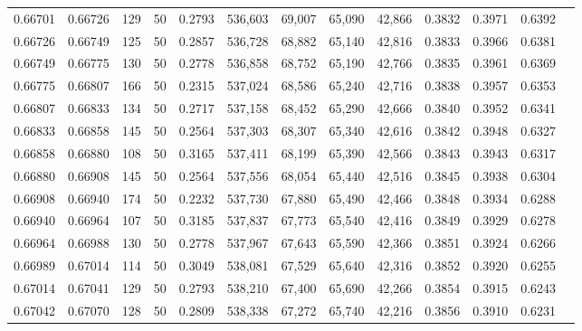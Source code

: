 \begin{tabular}{rrrrrrrrrrrrr}
0.66701 & 0.66726 &   129 &  50 &                                     0.2793 & 536,603 &  69,007 &  65,090 &  42,866 & 0.3832 & 0.3971 & 0.6392 \\
0.66726 & 0.66749 &   125 &  50 &                                     0.2857 & 536,728 &  68,882 &  65,140 &  42,816 & 0.3833 & 0.3966 & 0.6381 \\
0.66749 & 0.66775 &   130 &  50 &                                     0.2778 & 536,858 &  68,752 &  65,190 &  42,766 & 0.3835 & 0.3961 & 0.6369 \\
0.66775 & 0.66807 &   166 &  50 &                                     0.2315 & 537,024 &  68,586 &  65,240 &  42,716 & 0.3838 & 0.3957 & 0.6353 \\
0.66807 & 0.66833 &   134 &  50 &                                     0.2717 & 537,158 &  68,452 &  65,290 &  42,666 & 0.3840 & 0.3952 & 0.6341 \\
0.66833 & 0.66858 &   145 &  50 &                                     0.2564 & 537,303 &  68,307 &  65,340 &  42,616 & 0.3842 & 0.3948 & 0.6327 \\
0.66858 & 0.66880 &   108 &  50 &                                     0.3165 & 537,411 &  68,199 &  65,390 &  42,566 & 0.3843 & 0.3943 & 0.6317 \\
0.66880 & 0.66908 &   145 &  50 &                                     0.2564 & 537,556 &  68,054 &  65,440 &  42,516 & 0.3845 & 0.3938 & 0.6304 \\
0.66908 & 0.66940 &   174 &  50 &                                     0.2232 & 537,730 &  67,880 &  65,490 &  42,466 & 0.3848 & 0.3934 & 0.6288 \\
0.66940 & 0.66964 &   107 &  50 &                                     0.3185 & 537,837 &  67,773 &  65,540 &  42,416 & 0.3849 & 0.3929 & 0.6278 \\
0.66964 & 0.66988 &   130 &  50 &                                     0.2778 & 537,967 &  67,643 &  65,590 &  42,366 & 0.3851 & 0.3924 & 0.6266 \\
0.66989 & 0.67014 &   114 &  50 &                                     0.3049 & 538,081 &  67,529 &  65,640 &  42,316 & 0.3852 & 0.3920 & 0.6255 \\
0.67014 & 0.67041 &   129 &  50 &                                     0.2793 & 538,210 &  67,400 &  65,690 &  42,266 & 0.3854 & 0.3915 & 0.6243 \\
0.67042 & 0.67070 &   128 &  50 &                                     0.2809 & 538,338 &  67,272 &  65,740 &  42,216 & 0.3856 & 0.3910 & 0.6231 \\

\end{tabular}
